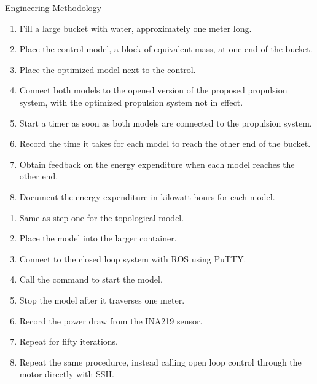 \documentclass[final, 16pt]{beamer}
\newlength{\colwidth}
\newlength{\twocolwidth}
\begin{document}
\begin{frame}[t]
\begin{columns}[t]
\begin{column}{\twocolwidth}
\begin{block}{Engineering Methodology}

    \begin{minipage}[t]{0.48\linewidth}
      \begin{enumerate}
        \item Fill a large bucket with water, approximately one meter long.
        \item Place the control model, a block of equivalent mass, at one end of the bucket.
        \item Place the optimized model next to the control.
        \item Connect both models to the opened version of the proposed propulsion system, with the optimized propulsion system not in effect.
        \item Start a timer as soon as both models are connected to the propulsion system.
        \item Record the time it takes for each model to reach the other end of the bucket.
        \item Obtain feedback on the energy expenditure when each model reaches the other end.
        \item Document the energy expenditure in kilowatt-hours for each model.
      \end{enumerate}
    \end{minipage}\hfill%
    \begin{minipage}[t]{0.48\linewidth}

      \begin{enumerate}
        \item Same as step one for the topological model.
        \item Place the model into the larger container.
        \item Connect to the closed loop system with ROS using PuTTY.
        \item Call the command to start the model.
        \item Stop the model after it traverses one meter.
        \item Record the power draw from the INA219 sensor.
        \item Repeat for fifty iterations.
        \item Repeat the same procedurce, instead calling open loop control through the motor directly with SSH.
      \end{enumerate}
    \end{minipage}


\end{block}
\end{column}
\end{columns}
\end{frame}
\end{document}
